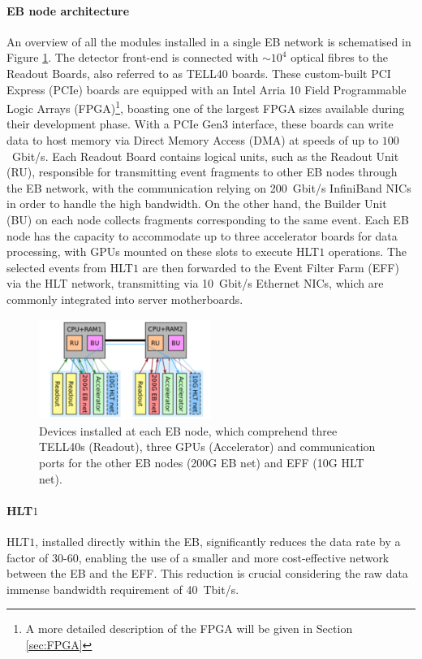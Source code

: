 \paragraph{EB node architecture}
An overview of all the modules installed in a single EB network is schematised in Figure \ref{devices_EBnode}. The detector front-end is connected with $\sim10^{4}$ optical fibres to the Readout Boards, also referred to as TELL40 boards. These custom-built PCI Express (PCIe) boards are equipped with an Intel Arria 10 Field Programmable Logic Arrays (FPGA)\footnote{A more detailed description of the FPGA will be given in Section \ref{sec:FPGA}}, boasting one of the largest FPGA sizes available during their development phase. With a PCIe Gen3 interface, these boards can write data to host memory via Direct Memory Access (DMA) at speeds of up to $100$~Gbit/s. Each Readout Board contains logical units, such as the Readout Unit (RU), responsible for transmitting event fragments to other EB nodes through the EB network, with the communication relying on 200~Gbit/s InfiniBand NICs in order to handle the high bandwidth. On the other hand, the Builder Unit (BU) on each node collects fragments corresponding to the same event. Each EB node has the capacity to accommodate up to three accelerator boards for data processing, with GPUs mounted on these slots to execute HLT$1$ operations. The selected events from HLT$1$ are then forwarded to the Event Filter Farm (EFF) via the HLT network, transmitting via 10~Gbit/s Ethernet NICs, which are commonly integrated into server motherboards. 

\begin{figure}
\centering
    \includegraphics[width=0.5\textwidth]{figures/zoom_EB_node.png}
    \caption{Devices installed at each EB node, which comprehend three TELL40s (Readout), three GPUs (Accelerator) and communication ports for the other EB nodes (200G EB net) and EFF (10G HLT net).}\label{devices_EBnode}
\end{figure}

\paragraph{HLT$1$}
HLT$1$, installed directly within the EB, significantly reduces the data rate by a factor of 30-60, enabling the use of a smaller and more cost-effective network between the EB and the EFF. This reduction is crucial considering the raw data immense bandwidth requirement of 40~Tbit/s.

